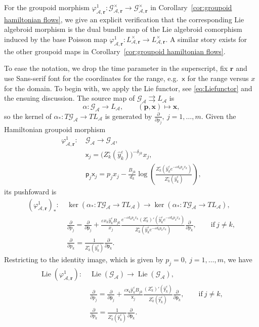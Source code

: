 \documentclass{amsart}
\numberwithin{equation}{section}
\newcommand{\bfp}{{\boldsymbol{p}}}
\newcommand{\bfr}{{\boldsymbol{r}}}
\newcommand{\bfx}{{\boldsymbol{x}}}
\newcommand{\sfx}{{\mathsf{x}}}
\newcommand{\sfy}{{\mathsf{y}}}
\newcommand{\sfp}{{\mathsf{p}}}
\newcommand{\cA}{\mathcal{A}}
\newcommand{\cG}{\mathcal{G}}
\newcommand{\Lie}{\operatorname{Lie}}
\newcommand{\rra}{\rightrightarrows}
\begin{document}
For the groupoid morphism $\varphi^1_{\cA,\bfr}: \cG^\times_{\cA,\bfr} \to \cG^\times_{\cA,\bfr}$ in Corollary~\ref{cor:groupoid hamiltonian flows}, we give an explicit verification that the corresponding Lie algebroid morphism is the dual bundle map of the Lie algebroid comorphism induced by the base Poisson map $\varphi^1_{\cA,\bfr}:L^\times_{\cA,\bfr}\to L^\times_{\cA,\bfr}$.
A similar story exists for the other groupoid maps in Corollary~\ref{cor:groupoid hamiltonian flows}.

To ease the notation, we drop the time parameter in the superscript, fix $\bfr$ and use Sans-serif font for the coordinates for the range, e.g.\ $\sfx$ for the range versus $x$ for the domain.
To begin with, we apply the Lie functor, see \eqref{eq:Liefunctor} and the ensuing discussion.
The source map of $\cG_\cA \rra L_\cA$ is 
\[
	\alpha: \cG_\cA \to L_\cA, \qquad (\bfp, \bfx) \mapsto \bfx,
\]
so the kernel of $\alpha_*: T\cG_\cA \to TL_\cA$ is generated by $\frac{\partial}{\partial p_j}, \> j = 1, \ldots, m$.
Given the Hamiltonian groupoid morphism
\begin{align*}
	\varphi^1_{\cA,\bfr}: ~& \cG_\cA \to \cG_\cA, \\
	& \sfx_j = \big(Z_k^\circ(\hat y_k^\varepsilon)\big)^{-\delta_{jk}}x_j, \\
	& \sfp_j \sfx_j = p_jx_j-\frac{B_{jk}}{d_k}\log\left(\frac{Z_k^\circ\left(\hat y_k^\varepsilon e^{-\varepsilon d_kp_kx_k}\right)}{Z_k^\circ(\hat y_k^\varepsilon)}\right),
\end{align*}
its pushfoward is
\begin{align*}
	\left(\varphi^1_{\cA,\bfr}\right)_*: ~& \ker(\alpha_*: T\cG_\cA \to TL_\cA) \to \ker(\alpha_*: T\cG_\cA \to TL_\cA),  \\
	& \frac{\partial}{\partial p_j} 
	= \frac{\partial}{\partial \sfp_j} + \frac{\varepsilon x_k \hat{y}_k^\varepsilon B_{jk}}{x_j} \frac{ e^{-\varepsilon d_k p_k x_k} (Z_k^\circ)'\left(\hat y_k^\varepsilon e^{-\varepsilon d_k p_k x_k}\right)}{Z_k^\circ\left(\hat y_k^\varepsilon e^{-\varepsilon d_k p_k x_k}\right)} \frac{\partial}{\partial p_k}, \qquad \text{if}~ j \ne k, \\
	& \frac{\partial}{\partial p_k}
	= \frac{1}{Z_k^\circ(\hat y_k^\varepsilon)}\frac{\partial}{\partial \sfp_k}.
\end{align*}
Restricting to the identity image, which is given by $p_j = 0, \> j = 1, \ldots, m$, we have
\begin{align*}
	\Lie \left(\varphi^1_{\cA,\bfr} \right): ~& \Lie \left(\cG_\cA \right) \to \Lie \left( \cG_\cA \right),  \\
	& \frac{\partial}{\partial p_j}
	= \frac{\partial}{\partial \sfp_j} + \frac{\varepsilon \sfx_k \hat{\sfy}_k^\varepsilon B_{jk}}{\sfx_j} \frac{(Z_k^\circ)'\left(\hat \sfy_k^\varepsilon \right)}{Z_k^\circ\left(\hat \sfy_k^\varepsilon \right)} \frac{\partial}{\partial \sfp_k}, \qquad \text{if}~ j \ne k, \\
	& \frac{\partial}{\partial p_k} 
	= \frac{1}{Z_k^\circ(\hat{\sfy}_k^\varepsilon)}\frac{\partial}{\partial \sfp_k}.
\end{align*}
\end{document}

